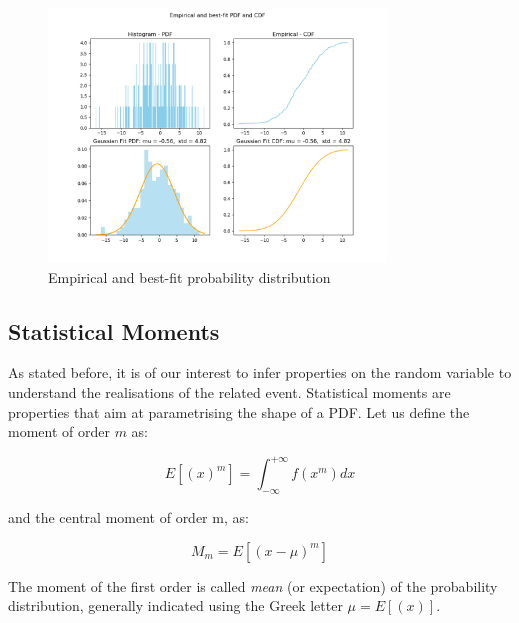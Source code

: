 \begin{figure}[hbt!]
\centering
\includegraphics[width=0.8\textwidth]{SectionLetsMath/elemStat_figures/fig_empiricalPdfCdf.png}
\captionsetup{type=figure}
\caption{Empirical and best-fit probability distribution}
\label{fig_empiricalPdfCdf}
\end{figure}

\subsection{Statistical Moments}
As stated before, it is of our interest to infer properties on the random variable to understand the realisations of the related event. Statistical moments are properties that aim at parametrising the shape of a PDF. Let us define the moment of order $m$ as:

\begin{equation}
E\left[\left(x\right)^m\right]=\int_{-\infty}^{+\infty}f\left(x^m\right)dx
\label{eq_momentOfOrderm}
\end{equation}

and the central moment of order m, as:

\begin{equation}
M_m=E[\left(x-\mu\right)^m]
\label{eq_centralMomentOfOrderm}
\end{equation}

The moment of the first order is called \textit{mean} (or expectation) of the probability distribution, generally indicated using the Greek letter $\mu=E[(x)]$.\par

